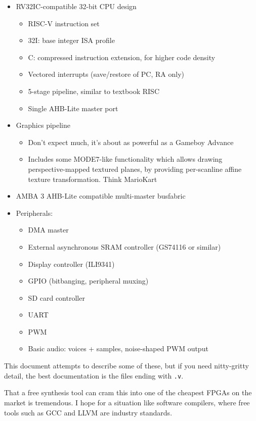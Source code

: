 \begin{itemize}
\item RV32IC-compatible 32-bit CPU design
	\begin{itemize}
	\item RISC-V instruction set
	\item 32I: base integer ISA profile
	\item C: compressed instruction extension, for higher code density
	\item Vectored interrupts (save/restore of PC, RA only)
	\item 5-stage pipeline, similar to textbook RISC
	\item Single AHB-Lite master port
	\end{itemize}
\item Graphics pipeline
	\begin{itemize}
	\item Don't expect much, it's about as powerful as a Gameboy Advance
	\item Includes some MODE7-like functionality which allows drawing perspective-mapped textured planes, by providing per-scanline affine texture transformation. Think MarioKart
	\end{itemize}
\item AMBA 3 AHB-Lite compatible multi-master busfabric
\item Peripherals:
	\begin{itemize}
	\item DMA master
	\item External asynchronous SRAM controller (GS74116 or similar)
	\item Display controller (ILI9341)
	\item GPIO (bitbanging, peripheral muxing)
	\item SD card controller
	\item UART
	\item PWM
	\item Basic audio: voices + samples, noise-shaped PWM output
	\end{itemize}
\end{itemize}

This document attempts to describe some of these, but if you need nitty-gritty detail, the best documentation is the files ending with {\tt .v}.

That a free synthesis tool can cram this into one of the cheapest FPGAs on the market is tremendous. I hope for a situation like software compilers, where free tools such as GCC and LLVM are industry standards.

